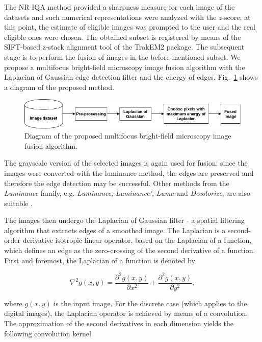 The NR-IQA method provided a sharpness measure for each image of the datasets and such numerical representations were analyzed with the $z$-score; at this point, the estimate of eligible images was prompted to the user and the real eligible ones were chosen. The obtained subset is registered by means of the SIFT-based z-stack alignment tool of the TrakEM2 package. The subsequent stage is to perform the fusion of images in the before-mentioned subset. We propose a multifocus bright-field microscopy image fusion algorithm with the Laplacian of Gaussian edge detection filter and the energy of edges. Fig.~\ref{fig:fusion_pipeline} shows a diagram of the proposed method.

\begin{figure}[ht]
    \centering
    \caption{Diagram of the proposed multifocus bright-field microscopy image fusion algorithm.}
    \label{fig:fusion_pipeline}
    \includegraphics[scale=0.65]{images/fusion_pipeline.png}
    \centering
    \fautor
\end{figure}

The grayscale version of the selected images is again used for fusion; since the images were converted with the luminance method, the edges are preserved and therefore the edge detection may be successful. Other methods from the \emph{Luminance} family, e.g. \emph{Luminance}, \emph{Luminance\'}, \emph{Luma} and \emph{Decolorize}, are also suitable \cite{kanan2012color}.

The images then undergo the Laplacian of Gaussian filter - a spatial filtering algorithm that extracts edges of a smoothed image. The Laplacian is a second-order derivative isotropic linear operator, based on the Laplacian of a function, which defines an edge as the zero-crossing of the second derivative of a function. First and foremost, the Laplacian of a function is denoted by

\begin{equation}
\label{eqn:laplacian_of_function}
\nabla^{2}g(x,y) = \frac{\partial^{2} g(x,y)}{\partial x^{2}}
                    +
                  \frac{\partial^{2} g(x,y)}{\partial y^{2}},
\end{equation}

\noindent where $g(x,y)$ is the input image. For the discrete case (which applies to the digital images), the Laplacian operator is achieved by means of a convolution. The approximation of the second derivatives in each dimension yields the following convolution kernel

